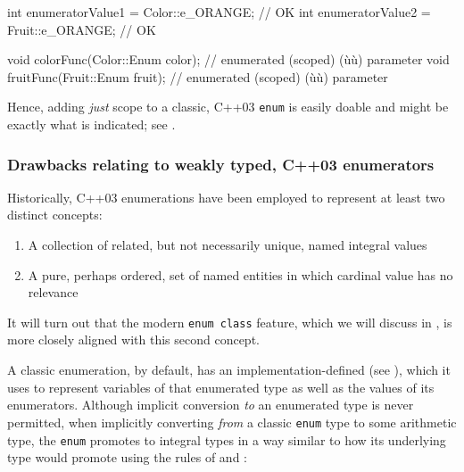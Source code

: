 \begin{emcppslisting}[emcppsbatch=e1]
int enumeratorValue1 = Color::e_ORANGE;  // OK
int enumeratorValue2 = Fruit::e_ORANGE;  // OK

void colorFunc(Color::Enum color);  // enumerated (scoped) (ù{}ù) parameter
void fruitFunc(Fruit::Enum fruit);  // enumerated (scoped) (ù{}ù) parameter
\end{emcppslisting}

\noindent Hence, adding \emph{just} scope to a classic, C++03 \lstinline!enum! is
easily doable and might be exactly what is indicated; see . 

\subsubsection[Drawbacks relating to weakly typed, C++03 enumerators]{Drawbacks relating to weakly typed, C++03 enumerators}\label{drawbacks-relating-to-weakly-typed,-c++03-enumerators}

Historically, C++03 enumerations have been employed to represent at
least two distinct concepts:

\begin{enumerate}
\item{A collection of related, but not necessarily unique, named integral values}
\item{A pure, perhaps ordered, set of named entities in which cardinal value has no relevance}
\end{enumerate}

\noindent It will turn out that the modern \lstinline!enum!~\lstinline!class! feature,
which we will discuss in , 
is more closely aligned with this second
concept.

A classic enumeration, by default, has an implementation-defined
 (see ),
which it uses to represent
variables of that enumerated type as well as the values of its
enumerators. Although implicit conversion \emph{to} an enumerated type is
never permitted, when implicitly converting \emph{from} a classic
\lstinline!enum! type to some arithmetic type, the \lstinline!enum! promotes
to integral types in a way similar to how its underlying type would
promote using the rules of  and
:

